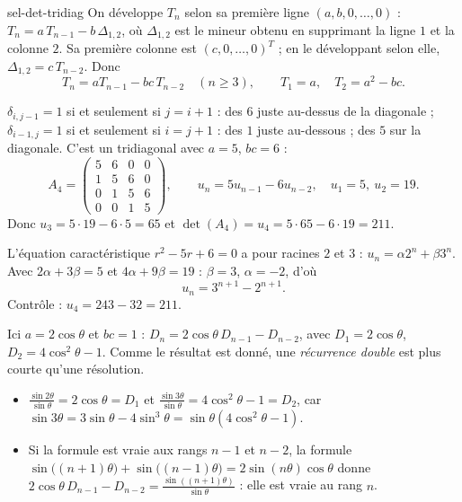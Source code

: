 \begin{corrige}{sel-det-tridiag}
 On développe $T_n$ selon sa première ligne $(a,b,0,\dots,0)$ : $T_n=a\,T_{n-1}-b\,\Delta_{1,2}$, où $\Delta_{1,2}$ est le mineur obtenu en supprimant la ligne $1$ et la colonne $2$. Sa première colonne est $(c,0,\dots,0)^T$ ; en le développant selon elle, $\Delta_{1,2}=c\,T_{n-2}$. Donc
\[T_n=aT_{n-1}-bc\,T_{n-2}\quad(n\geq3),\qquad T_1=a,\quad T_2=a^2-bc.\]

 $\delta_{i,j-1}=1$ si et seulement si $j=i+1$ : des $6$ juste au-dessus de la diagonale ; $\delta_{i-1,j}=1$ si et seulement si $i=j+1$ : des $1$ juste au-dessous ; des $5$ sur la diagonale. C'est un tridiagonal avec $a=5$, $bc=6$ :
\[A_4=\begin{pmatrix}5&6&0&0\\1&5&6&0\\0&1&5&6\\0&0&1&5\end{pmatrix},\qquad u_n=5u_{n-1}-6u_{n-2},\quad u_1=5,\ u_2=19.\]
Donc $u_3=5\cdot19-6\cdot5=65$ et $\det(A_4)=u_4=5\cdot65-6\cdot19=211$.

 L'équation caractéristique $r^2-5r+6=0$ a pour racines $2$ et $3$ : $u_n=\alpha2^n+\beta3^n$. Avec $2\alpha+3\beta=5$ et $4\alpha+9\beta=19$ : $\beta=3$, $\alpha=-2$, d'où
\[u_n=3^{n+1}-2^{n+1}.\]
Contrôle : $u_4=243-32=211$.

 Ici $a=2\cos\theta$ et $bc=1$ : $D_n=2\cos\theta\,D_{n-1}-D_{n-2}$, avec $D_1=2\cos\theta$, $D_2=4\cos^2\theta-1$. Comme le résultat est donné, une \emph{récurrence double} est plus courte qu'une résolution.
\begin{itemize}
\item $\frac{\sin2\theta}{\sin\theta}=2\cos\theta=D_1$ et $\frac{\sin3\theta}{\sin\theta}=4\cos^2\theta-1=D_2$, car $\sin3\theta=3\sin\theta-4\sin^3\theta=\sin\theta(4\cos^2\theta-1)$.
\item Si la formule est vraie aux rangs $n-1$ et $n-2$, la formule $\sin\big((n+1)\theta\big)+\sin\big((n-1)\theta\big)=2\sin(n\theta)\cos\theta$ donne $2\cos\theta\,D_{n-1}-D_{n-2}=\frac{\sin((n+1)\theta)}{\sin\theta}$ : elle est vraie au rang $n$.
\end{itemize}


\end{corrige}

